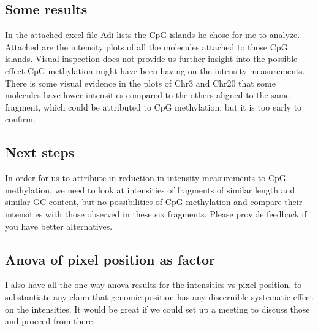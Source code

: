 \documentclass[11pt]{article}
\begin{document}
\subsection*{Some results}
In the attached excel file Adi lists the CpG islands he chose for me to analyze. Attached are the intensity plots of all the molecules attached to those CpG islands. Visual inspection does not provide us further insight into the possible effect CpG methylation might have been having on the intensity measurements. There is some visual evidence in the plots of Chr3 and Chr20 that some molecules have lower intensities compared to the others aligned to the same fragment, which could be attributed to CpG methylation, but it is too early to confirm. 

\subsection*{Next steps}
In order for us to attribute in reduction in intensity measurements to CpG methylation, we need to look at intensities of fragments of similar length and similar GC content, but no possibilities of CpG methylation and compare their intensities with those observed in these six fragments. Please provide feedback if you have better alternatives. 

\subsection*{Anova of pixel position as factor}
I also have all the one-way anova results for the intensities vs pixel position, to substantiate any claim that genomic position has any discernible systematic effect on the intensities. It would be great if we could set up a meeting to discuss those and proceed from there.
\end{document}
